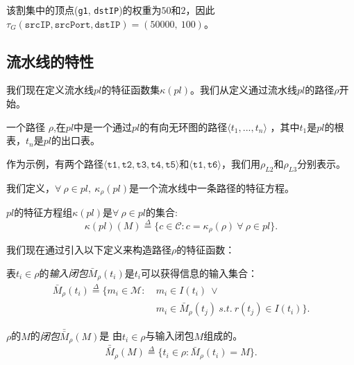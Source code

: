 该割集中的顶点(\texttt{g1}, \texttt{dstIP})的权重为$50$和$2$，因此$\tau_G(\texttt{srcIP}, \texttt{srcPort}, \texttt{dstIP}) = (50000,\ 100)$。



\subsection{流水线的特性}
我们现在定义流水线$pl$的特征函数集$\kappa(pl)$。我们从定义通过流水线$pl$的路径$\rho$开始。


\begin{definition}
一个路径 $\rho$,在$pl$中是一个通过$pl$的有向无环图的路径$\langle t_1, ..., t_n \rangle$ ，其中$t_1$是$pl$的根表，$t_n$是$pl$的出口表。

\end{definition}

作为示例，\exampledp 有两个路径$\langle \texttt{t1}, \texttt{t2}, \texttt{t3}, \texttt{t4}, \texttt{t5} \rangle$和$\langle \texttt{t1}, \texttt{t6} \rangle$，我们用$\rho_{L2}$和$\rho_{L3}$分别表示。

我们定义，$\forall\ \rho \in pl,\ \kappa_\rho(pl)$是一个流水线中一条路径的特征方程。


\begin{definition} $pl$的特征方程组$\kappa(pl)$是$\forall\ \rho \in pl$的集合:
\begin{equation*}
\kappa(pl)(M) \overset{\Delta}{=} \{c \in \mathcal{C} : c = \kappa_\rho(\rho)\ \forall\ \rho \in pl\}.
\end{equation*}
\end{definition}

我们现在通过引入以下定义来构造路径$\rho$的特征函数：

\begin{definition} 表$t_i \in \rho$的{\em 输入闭包$\bar{M}_\rho(t_i)$}是$t_i$可以获得信息的输入集合：
\begin{equation*}
\begin{split}
\bar{M}_\rho(t_i) \overset{\Delta}{=} \{m_i \in \mathcal{M} :\ &m_i \in I(t_i)\ \vee\\ &m_i \in \bar{M}_\rho(t_j)\ s.t.\ r(t_j) \in I(t_i)\}.
\end{split}
\end{equation*}
\end{definition}

\begin{definition} $\rho$的$M$的{\em 闭包$\bar{\bar{M}}_\rho(M)$}是 由$t_i \in \rho$与输入闭包$M$组成的。
\begin{equation*}
\bar{\bar{M}}_\rho(M) \overset{\Delta}{=} \{t_i \in \rho : \bar{M}_\rho(t_i) = M\}. 
\end{equation*}
\end{definition}

